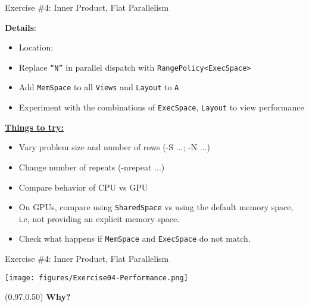 \begin{frame}[fragile]{Exercise \#4: Inner Product, Flat Parallelism}

  \textbf{Details}:
  \begin{small}
  \begin{itemize}
\item Location: 
\item Replace \texttt{``N''} in parallel dispatch with \texttt{RangePolicy<ExecSpace>}
\item Add \texttt{MemSpace} to all \texttt{Views} and \texttt{Layout} to \texttt{A}
\item Experiment with the combinations of \texttt{ExecSpace}, \texttt{Layout} to view performance
\end{itemize}
  \end{small}


\ul{\textbf{Things to try:}}
  \begin{small}
  \begin{itemize}
  \item Vary problem size and number of rows (-S ...; -N ...)
  \item Change number of repeats (-nrepeat ...)
  \item Compare behavior of CPU vs GPU
  \item On GPUs, compare using \texttt{SharedSpace} vs using the default memory space, i.e, not providing an explicit memory space.
  \item Check what happens if \texttt{MemSpace} and \texttt{ExecSpace} do not match.
  \end{itemize}
  \end{small}
\end{frame}


\begin{frame}[fragile]{Exercise \#4: Inner Product, Flat Parallelism}


  \vspace{-5pt}
  \hspace{-15pt}
    \texttt{[image: figures/Exercise04-Performance.png]}
  \vspace{-15pt}

  \begin{textblock*}{0.5\textwidth}(0.97\textwidth,0.50\textheight)
    \textbf{\LARGE Why?}
  \end{textblock*}

\end{frame}

